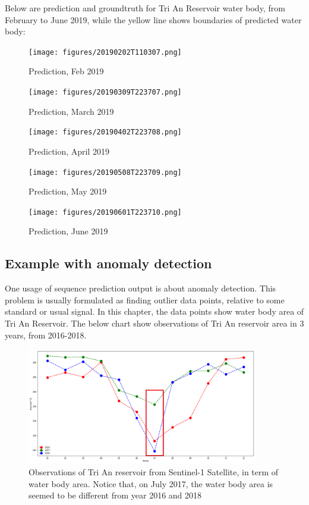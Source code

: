 Below are prediction and groundtruth for Tri An Reservoir water body, from February to June 2019, while the yellow line shows boundaries of predicted water body:

\begin{figure}[h!]
	\centering
	\texttt{[image: figures/20190202T110307.png]}
	\caption{Prediction, Feb 2019}
\end{figure}

\begin{figure}[h!]
	\centering
	\texttt{[image: figures/20190309T223707.png]}
	\caption{Prediction, March 2019}
\end{figure}

\begin{figure}[h!]
	\centering
	\texttt{[image: figures/20190402T223708.png]}
	\caption{Prediction, April 2019}
\end{figure}

\begin{figure}[h!]
	\centering
	\texttt{[image: figures/20190508T223709.png]}
	\caption{Prediction, May 2019}
\end{figure}

\begin{figure}[h!]
	\centering
	\texttt{[image: figures/20190601T223710.png]}
	\caption{Prediction, June 2019}
\end{figure}


\subsection{Example with anomaly detection}
\label{section:anomalyDetection}

One usage of sequence prediction output is about anomaly detection. This problem is usually formulated as finding outlier data points, relative to some standard or usual signal. In this chapter, the data points show water body area of Tri An Reservoir. The below chart show observations of Tri An reservoir area in 3 years, from 2016-2018.

\begin{figure}[h!]
	\centering
	\includegraphics[width=0.9\textwidth]{figures/observations.png}
	\caption{Observations of Tri An reservoir from Sentinel-1 Satellite, in term of water body area. Notice that, on July 2017, the water body area is seemed to be different from year 2016 and 2018}
	\label{fig:observation}
\end{figure}

